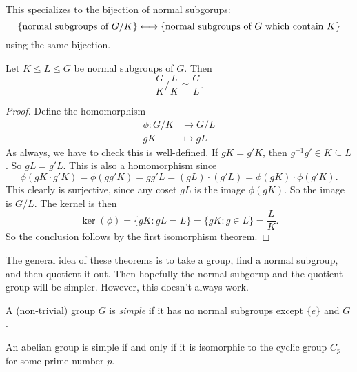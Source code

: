 \documentclass[a4paper]{article}
\begin{document}
This specializes to the bijection of normal subgorups:
\[
  \{\text{normal subgroups of }G/K\} \longleftrightarrow\{\text{normal subgroups of }G\text{ which contain }K\}\\
\]
using the same bijection.

\begin{thm}
  Let $K \leq L \leq G$ be normal subgroups of $G$. Then
  \[
    \frac{G}{K}\big/ \frac{L}{K} \cong \frac{G}{L}.
  \]
\end{thm}

\begin{proof}
  Define the homomorphism
  \begin{align*}
    \phi: G/K &\to G/L\\
    gK &\mapsto gL
  \end{align*}
  As always, we have to check this is well-defined. If $gK = g'K$, then $g^{-1}g' \in K \subseteq L$. So $gL = g'L$. This is also a homomorphism since
  \[
    \phi(gK \cdot g'K) = \phi(gg'K) = gg'L = (gL) \cdot (g'L) = \phi(gK) \cdot \phi(g'K).
  \]
  This clearly is surjective, since any coset $gL$ is the image $\phi(gK)$. So the image is $G/L$. The kernel is then
  \[
    \ker(\phi) = \{gK: gL = L\} = \{gK: g \in L\} = \frac{L}{K}.
  \]
  So the conclusion follows by the first isomorphism theorem.
\end{proof}

The general idea of these theorems is to take a group, find a normal subgroup, and then quotient it out. Then hopefully the normal subgorup and the quotient group will be simpler. However, this doesn't always work.

\begin{defi}
  A (non-trivial) group $G$ is \emph{simple} if it has no normal subgroups except $\{e\}$ and $G$.
\end{defi}

\begin{lemma}
  An abelian group is simple if and only if it is isomorphic to the cyclic group $C_p$ for some prime number $p$.
\end{lemma}
\end{document}
